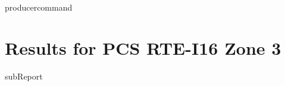 {{ producercommand }}



    \section{Results for PCS RTE-I16 Zone 3}

    {{subReport}}
    \newpage

